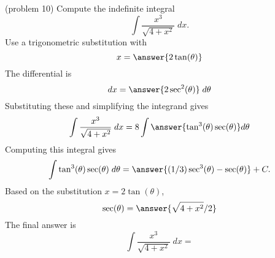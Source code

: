 \documentclass[handout]{ximera}
\begin{document}
\begin{problem}(problem 10)
Compute the indefinite integral
\[
\int \frac{x^3}{\sqrt{4 + x^2}} \; dx.
\]
Use a trigonometric substitution with\\
\[
x = \answer{2\tan(\theta)}
\]
The differential is\\
\[
dx = \answer{2\sec^2(\theta)} \; d\theta
\]
Substituting these and simplifying the integrand gives\\
\[
\int \frac{x^3}{\sqrt{4 + x^2}} \; dx = 8\int \answer{\tan^3(\theta)\sec(\theta)} d\theta
\]
Computing this integral gives
\[
\int \tan^3(\theta)\sec(\theta) \; d\theta = \answer{(1/3)\sec^3(\theta) - \sec(\theta)} + C.
\]
Based on the substitution $x = 2\tan(\theta)$, \\
\[
\sec(\theta) = \answer{\sqrt{4+x^2}/2}
\]
The final answer is
\[
\int  \frac{x^3}{\sqrt{4 + x^2}} \; dx = 
\]
\begin{center}
\begin{multipleChoice}
\end{multipleChoice}
\end{center}
\end{problem}
\end{document}
